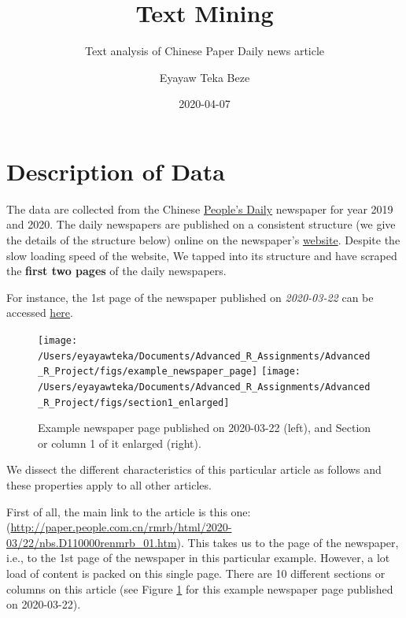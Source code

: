 \documentclass[
  12pt,
]{article}
\title{Text Mining}
\subtitle{Text analysis of Chinese Paper Daily news article}
\author{Eyayaw Teka Beze}
\date{2020-04-07}
\begin{document}
\maketitle

{
\hypersetup{linkcolor=}
\setcounter{tocdepth}{2}
\tableofcontents
}
\hypertarget{description-of-data}{%
\section{Description of Data}\label{description-of-data}}

The data are collected from the Chinese \href{https://en.wikipedia.org/wiki/People\%27s_Daily}{People's Daily} newspaper for year 2019 and 2020. The daily newspapers are published on a consistent structure (we give the details of the structure below) online on the newspaper's \href{paper.people.com.cn}{website}. Despite the slow loading speed of the website, We tapped into its structure and have scraped the \textbf{first two pages} of the daily newspapers.

For instance, the 1st page of the newspaper published on \emph{2020-03-22} can be accessed \href{http://paper.people.com.cn/rmrb/html/2020-03/22/nbs.D110000renmrb_01.htm}{here}.

\begin{figure}

{\centering \texttt{[image: /Users/eyayawteka/Documents/Advanced\_R\_Assignments/Advanced\_R\_Project/figs/example\_newspaper\_page]} \texttt{[image: /Users/eyayawteka/Documents/Advanced\_R\_Assignments/Advanced\_R\_Project/figs/section1\_enlarged]} 

}

\caption{Example newspaper page published on 2020-03-22 (left), and Section or column 1 of it enlarged (right).}\label{fig:example-newspaper}
\end{figure}

We dissect the different characteristics of this particular article as follows and these properties apply to all other articles.

First of all, the main link to the article is this one: (\url{http://paper.people.com.cn/rmrb/html/2020-03/22/nbs.D110000renmrb_01.htm}). This takes us to the page of the newspaper, i.e., to the 1st page of the newspaper in this particular example. However, a lot load of content is packed on this single page. There are 10 different sections or columns on this article (see Figure \ref{fig:example-newspaper} for this example newspaper page published on 2020-03-22).
\end{document}
